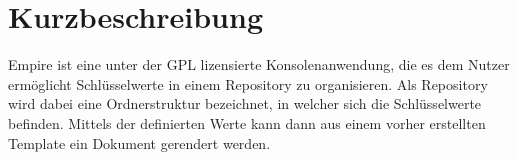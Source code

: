 
\section{Kurzbeschreibung}

Empire ist eine unter der GPL lizensierte Konsolenanwendung, die es dem Nutzer ermöglicht Schlüsselwerte in einem Repository zu organisieren. Als Repository wird dabei eine Ordnerstruktur bezeichnet, in welcher sich die Schlüsselwerte befinden.
Mittels der definierten Werte kann dann aus einem vorher erstellten Template ein Dokument gerendert werden.
